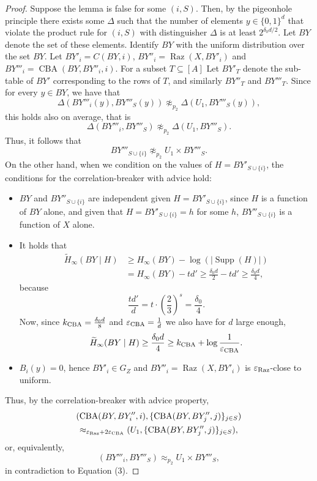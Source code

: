 \documentclass[10pt,a4paper]{article}
\DeclareMathOperator{\Supp}{Supp}
\DeclareMathOperator{\CBA}{CBA}
\DeclareMathOperator{\Raz}{Raz}
\newcommand{\HH}{\widetilde H_\infty}
\begin{document}
\begin{proof}
Suppose the lemma is false for some $(i,S)$. Then, by the pigeonhole principle there exists some $\Delta$ such that the number of elements $y\in\{0,1\}^d$ that violate the product rule for $(i,S)$ with distinguisher $\Delta$ is at least $2^{\delta_0d/2}$. Let $BY$ denote the set of these elements. Identify $BY$ with the uniform distribution over the set $BY$.
Let $BY'_i=C(BY,i)$, $BY''_i=\Raz(X,BY'_i)$ and $BY'''_i=\CBA(BY,BY''_i,i)$. For a subset $T\subseteq[A]$ Let $BY'_T$ denote the sub-table of $BY'$ corresponding to the rows of $T$, and similarly $BY''_T$ and $BY'''_T$. Since for every $y\in BY$, we have that
\[\Delta(BY'''_i(y),BY'''_S(y))\not\approx_{p_2}\Delta(U_1,BY'''_S(y)),\]
this holds also on average, that is
\[\Delta(BY'''_i,BY'''_S)\not\approx_{p_2}\Delta(U_1,BY'''_S).\]
Thus, it follows that
\begin{equation}BY'''_{S\cup\{i\}}\not\approx_{p_2}U_1\times BY'''_S.\tag{3}\label{eq:product}\end{equation}
On the other hand, when we condition on the values of $H=BY'_{S\cup\{i\}}$, the conditions for the correlation-breaker with advice hold:
\begin{itemize}
\item $BY$ and $BY''_{S\cup\{i\}}$ are independent given $H=BY'_{S\cup\{i\}}$, since $H$ is a function of $BY$ alone, and given that $H=BY'_{S\cup\{i\}}=h$ for some $h$, $BY''_{S\cup\{i\}}$ is a function of $X$ alone.
\item It holds that
\begin{align*}
\HH(BY\mid H)&\ge H_\infty(BY)-\log(|\Supp(H)|)\\
&=H_\infty(BY)-td'\ge\frac{\delta_0d}2-td'\ge\frac{\delta_0d}4,
\end{align*}
because
\[\frac{td'}d=t\cdot\left(\frac23\right)^s=\frac{\delta_0}4.\]
Now, since $k_{\rm CBA}=\frac{\delta_0d}8$ and $\varepsilon_{\rm CBA}=\frac1d$ we also have for $d$ large enough,
\[\HH(BY\mid H)\ge\frac{\delta_0d}4\ge k_{\rm CBA}+\log\frac1{\varepsilon_{\rm CBA}}.\]
\item $B_i(y)=0$, hence $BY'_i\in G_Z$ and $BY''_i=\Raz(X,BY'_i)$ is $\varepsilon_{\rm Raz}$-close to uniform.
\end{itemize}
Thus, by the correlation-breaker with advice property,
\begin{multline*}
(\CBA(BY,BY''_i,i),\{\CBA(BY,BY''_j,j)\}_{j\in S})\\
\approx_{\varepsilon_{\rm Raz}+2\varepsilon_{\rm CBA}}(U_1,\{\CBA(BY,BY''_j,j)\}_{j\in S}),
\end{multline*}
or, equivalently,
\[(BY'''_i,BY'''_S)\approx_{p_2}U_1\times BY'''_S,\]
in contradiction to Equation (3).
\end{proof}
\end{document}
